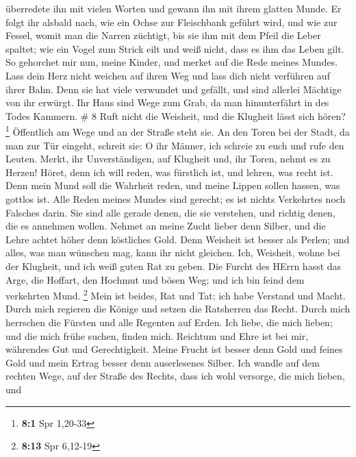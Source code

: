 überredete ihn mit vielen Worten und gewann ihn mit ihrem glatten Munde.
 Er folgt ihr alsbald nach, wie ein Ochse zur Fleischbank
geführt wird, und wie zur Fessel, womit man die Narren züchtigt,
 bis sie ihm mit dem Pfeil die Leber spaltet; wie ein Vogel
zum Strick eilt und weiß nicht, dass es ihm das Leben gilt.
 So gehorchet mir nun, meine Kinder, und merket auf die
Rede meines Mundes.  Lass dein Herz nicht weichen auf ihren
Weg und lass dich nicht verführen auf ihrer Bahn.  Denn sie
hat viele verwundet und gefällt, und sind allerlei Mächtige von ihr
erwürgt.  Ihr Haus sind Wege zum Grab, da man hinunterfährt
in des Todes Kammern. \# 8  Ruft nicht die Weisheit, und die
Klugheit lässt sich hören? \footnote{\textbf{8:1} Spr 1,20-33}
 Öffentlich am Wege und an der Straße steht sie.
 An den Toren bei der Stadt, da man zur Tür eingeht, schreit
sie:  O ihr Männer, ich schreie zu euch und rufe den Leuten.
 Merkt, ihr Unverständigen, auf Klugheit und, ihr Toren,
nehmt es zu Herzen!  Höret, denn ich will reden, was
fürstlich ist, und lehren, was recht ist.  Denn mein Mund
soll die Wahrheit reden, und meine Lippen sollen hassen, was gottlos
ist.  Alle Reden meines Mundes sind gerecht; es ist nichts
Verkehrtes noch Falsches darin.  Sie sind alle gerade denen,
die sie verstehen, und richtig denen, die es annehmen wollen.
 Nehmet an meine Zucht lieber denn Silber, und die Lehre
achtet höher denn köstliches Gold.  Denn Weisheit ist
besser als Perlen; und alles, was man wünschen mag, kann ihr nicht
gleichen.  Ich, Weisheit, wohne bei der Klugheit, und ich
weiß guten Rat zu geben.  Die Furcht des HErrn hasst das
Arge, die Hoffart, den Hochmut und bösen Weg; und ich bin feind dem
verkehrten Mund. \footnote{\textbf{8:13} Spr 6,12-19}  Mein
ist beides, Rat und Tat; ich habe Verstand und Macht. 
Durch mich regieren die Könige und setzen die Ratsherren das Recht.
 Durch mich herrschen die Fürsten und alle Regenten auf
Erden.  Ich liebe, die mich lieben; und die mich frühe
suchen, finden mich.  Reichtum und Ehre ist bei mir,
währendes Gut und Gerechtigkeit.  Meine Frucht ist besser
denn Gold und feines Gold und mein Ertrag besser denn auserlesenes
Silber.  Ich wandle auf dem rechten Wege, auf der Straße
des Rechts,  dass ich wohl versorge, die mich lieben, und
